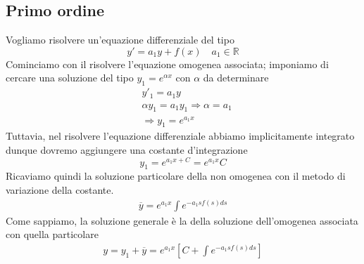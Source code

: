 \documentclass[10pt,a4paper]{article}
\begin{document}
\subsection{Primo ordine}\label{sec:costPrimoordine}
Vogliamo risolvere un'equazione differenziale del tipo
\[y' = a_1 y + f(x) \quad a_1 \in \mathbb{R}\]
Cominciamo con il risolvere l'equazione omogenea associata; imponiamo di cercare una soluzione del tipo \(y_1 = e^{\alpha x}\) con \(\alpha\) da determinare
\begin{align*}
	&y'_1 = a_1 y\\
	&\alpha y_1 = a_1 y_1 \Rightarrow \alpha = a_1\\
	&\Rightarrow y_1 = e^{a_1 x}
\end{align*}
Tuttavia, nel risolvere l'equazione differenziale abbiamo implicitamente integrato dunque dovremo aggiungere una costante d'integrazione
\[y_1 = e^{a_1 x+C} = e^{a_1 x} C\]
Ricaviamo quindi la soluzione particolare della non omogenea con il metodo di variazione della costante.
\begin{align*}
	\overline{y} = e^{a_1 x}\int e^{-a_1 s f(s) ds }
\end{align*}
Come sappiamo, la soluzione generale è la della soluzione dell'omogenea associata con quella particolare
\begin{align*}
	y = y_1 + \overline{y} = e^{a_1 x}[C+\int e^{-a_1 s f(s) ds }]
\end{align*}
\end{document}
